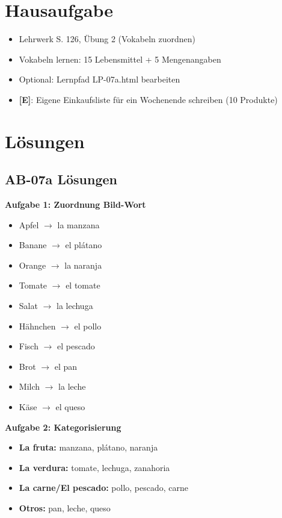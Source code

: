 \documentclass[11pt,a4paper]{article}
\newcommand{\E}{\textcolor{erweiterung}{\textbf{[E]}}}
\begin{document}
\section{Hausaufgabe}

\begin{itemize}
    \item Lehrwerk S. 126, Übung 2 (Vokabeln zuordnen)
    \item Vokabeln lernen: 15 Lebensmittel + 5 Mengenangaben
    \item Optional: Lernpfad LP-07a.html bearbeiten
    \item \E{}: Eigene Einkaufsliste für ein Wochenende schreiben (10 Produkte)
\end{itemize}

\section{Lösungen}

\subsection{AB-07a Lösungen}

\textbf{Aufgabe 1: Zuordnung Bild-Wort}
\begin{itemize}
    \item Apfel $\rightarrow$ la manzana
    \item Banane $\rightarrow$ el plátano
    \item Orange $\rightarrow$ la naranja
    \item Tomate $\rightarrow$ el tomate
    \item Salat $\rightarrow$ la lechuga
    \item Hähnchen $\rightarrow$ el pollo
    \item Fisch $\rightarrow$ el pescado
    \item Brot $\rightarrow$ el pan
    \item Milch $\rightarrow$ la leche
    \item Käse $\rightarrow$ el queso
\end{itemize}

\textbf{Aufgabe 2: Kategorisierung}
\begin{itemize}
    \item \textbf{La fruta:} manzana, plátano, naranja
    \item \textbf{La verdura:} tomate, lechuga, zanahoria
    \item \textbf{La carne/El pescado:} pollo, pescado, carne
    \item \textbf{Otros:} pan, leche, queso
\end{itemize}
\end{document}
